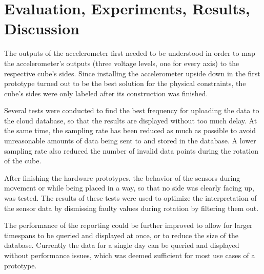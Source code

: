 \section{Evaluation, Experiments, Results, Discussion}

The outputs of the accelerometer first needed to be understood in order to map the accelerometer's outputs (three voltage levels, one for every axis) to the respective cube's sides. Since installing the accelerometer upside down in the first prototype turned out to be the best solution for the physical constraints, the cube's sides were only labeled after its construction was finished.

Several tests were conducted to find the best frequency for uploading the data to the cloud database, so that the results are displayed without too much delay. At the same time, the sampling rate has been reduced as much as possible to avoid unreasonable amounts of data being sent to and stored in the database. A lower sampling rate also reduced the number of invalid data points during the rotation of the cube.

After finishing the hardware prototypes, the behavior of the sensors during movement or while being placed in a way, so that no side was clearly facing up, was tested. The results of these tests were used to optimize the interpretation of the sensor data by dismissing faulty values during rotation by filtering them out.

The performance of the reporting could be further improved to allow for larger time\-spans to be queried and displayed at once, or to reduce the size of the database. Currently the data for a single day can be queried and displayed without performance issues, which was deemed sufficient for most use cases of a prototype.
